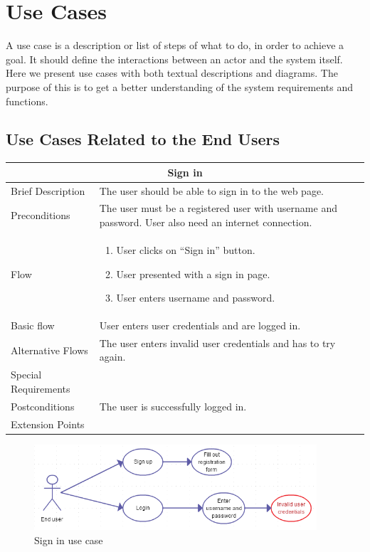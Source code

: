 \section{Use Cases}
\label{sec:SysReqUseCases}

A use case is a description or list of steps of what to do, in order to achieve a goal. It should define the interactions between an actor and the system itself. Here we present use cases with both textual descriptions and diagrams. The purpose of this is to get a better understanding of the system requirements and functions.

\subsection{Use Cases Related to the End Users}

\begin{minipage}{\linewidth}
\begin{tabular}{|l|p{85mm}|}
  \hline
  \multicolumn{2}{|c|}{\cellcolor{gray!25} \textbf{Sign in}} \\
  \hline
  Brief Description & The user should be able to sign in to the web page.\\
  Preconditions & The user must be a registered user with username and password. User also need an internet connection.\\
  Flow &
    \begin{enumerate}
      \item User clicks on “Sign in” button.
      \item User presented with a sign in page.
      \item User enters username and password.
    \end{enumerate} \\
  Basic flow & User enters user credentials and are logged in.\\
  Alternative Flows & The user enters invalid user credentials and has to try again.\\
  Special Requirements & \\
  Postconditions & The user is successfully logged in.\\
  Extension Points & \\
  \hline
\end{tabular}
\end{minipage}

\begin{figure}[ht!]
\centering
\includegraphics[width=105mm]{./SystemRequirements/img/loginUC.png}
\caption{Sign in use case \label{fig:SysReqUseCasesLogin}}
\end{figure}

